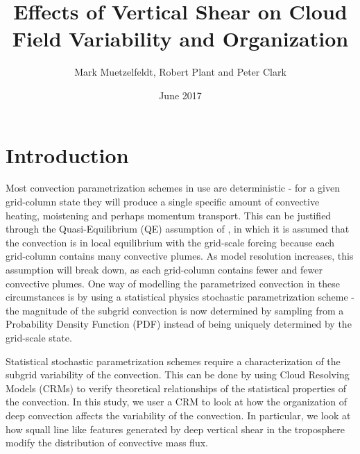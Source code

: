 \documentclass[11pt,a4paper]{article}
\title{Effects of Vertical Shear on Cloud Field Variability and Organization }
\author{Mark Muetzelfeldt, Robert Plant and  Peter Clark}
\date{June 2017}
\newcommand\todo[1]{\textbf{TODO: #1}}
\begin{document}
\maketitle
\section{Introduction}

Most convection parametrization schemes in use are deterministic - for a given grid-column state they will produce a single specific amount of convective heating, moistening and perhaps momentum transport. This can be justified through the Quasi-Equilibrium (QE) assumption of \cite{arakawa1974interaction}, in which it is assumed that the convection is in local equilibrium with the grid-scale forcing because each grid-column contains many convective plumes. As model resolution increases, this assumption will break down, as each grid-column contains fewer and fewer convective plumes. One way of modelling the parametrized convection in these circumstances is by using a statistical physics stochastic parametrization scheme \parencite{berner2017stochastic} - the magnitude of the subgrid convection is now determined by sampling from a Probability Density Function (PDF) instead of being uniquely determined by the grid-scale state.

Statistical stochastic parametrization schemes require a characterization of the subgrid variability of the convection. This can be done by using Cloud Resolving Models (CRMs) to verify theoretical relationships of the statistical properties of the convection. In this study, we user a CRM to look at how the organization of deep convection affects the variability of the convection. In particular, we look at how squall line like features generated by deep vertical shear in the troposphere modify the distribution of convective mass flux.

\end{document}
